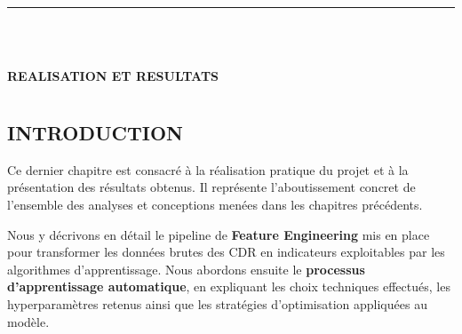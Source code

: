 \documentclass[12pt, oneside, a4paper]{report}
\begin{document}
\clearpage
\thispagestyle{fancy} %

\noindent\rule[-0.2cm]{0.45cm}{1.2cm}\hspace{0.15cm}%
\raisebox{0.85cm}{\rule{0.85\textwidth}{0.5pt}}\\[0.3cm]
\noindent{}\\[1cm]

\begin{center}
    {\huge\textbf{REALISATION ET RESULTATS}}
\end{center}
\vspace{1cm}

\begingroup
\let\cleardoublepage\relax
\let\clearpage\relax
\chapter*{} %
\vspace{-3cm} %
\minitoc
\endgroup

\vspace{1.5cm}
\minitoc

\section{INTRODUCTION}
Ce dernier chapitre est consacré à la réalisation pratique du projet et à la présentation des résultats obtenus. Il représente l'aboutissement concret de l'ensemble des analyses et conceptions menées dans les chapitres précédents.

Nous y décrivons en détail le pipeline de \textbf{Feature Engineering} mis en place pour transformer les données brutes des CDR en indicateurs exploitables par les algorithmes d'apprentissage. Nous abordons ensuite le \textbf{processus d'apprentissage automatique}, en expliquant les choix techniques effectués, les hyperparamètres retenus ainsi que les stratégies d'optimisation appliquées au modèle.
\end{document}
